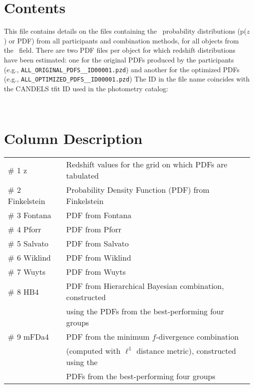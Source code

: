 \section*{Contents}
This file contains details on the files containing the \photoz\ probability distributions (p($z$) or PDF) from all participants and combination methods, for all objects from the \field\ field.  There are two PDF files per object for which redshift distributions have been estimated: one for the original PDFs produced by the participants (e.g., \texttt{ALL\_ORIGINAL\_PDFS\_\fieldshort\_ID00001.pzd}) and another for the optimized PDFs (e.g., \texttt{ALL\_OPTIMIZED\_PDFS\_\fieldshort\_ID00001.pzd}) The ID in the file name coincides with the CANDELS tfit ID used in the photometry catalog:

\photomcat\

\section*{Column Description}

\begin{center}
\begin{tabular}{ll}
\# 1 z            &	 Redshift values for the grid on which PDFs are tabulated \\
\# 2 Finkelstein  &  Probability Density Function (PDF) from Finkelstein \\
\# 3 Fontana 	  &	 PDF from Fontana \\
\# 4 Pforr 		  &	 PDF from Pforr \\
\# 5 Salvato 	  &	 PDF from Salvato \\
\# 6 Wiklind 	  &	 PDF from Wiklind \\
\# 7 Wuyts 		  &	 PDF from Wuyts \\
\# 8 HB4	  	  &	 PDF from Hierarchical Bayesian combination, constructed\\
                  &  using the PDFs from the best-performing four groups \\
\# 9 mFDa4	 	  &	 PDF from the minimum $f$-divergence combination\\
                  &  (computed with $\ell^1$ distance metric), constructed using the\\
                  &  PDFs from the best-performing four groups\\
\end{tabular}
\end{center}



